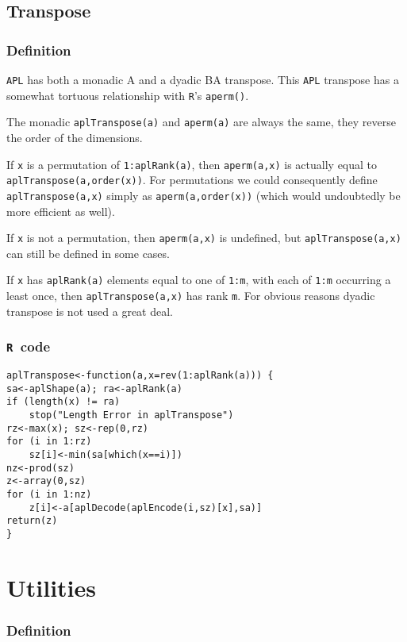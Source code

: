 \documentclass[11pt]{amsart}
\theoremstyle{plain}
\theoremstyle{definition}
\theoremstyle{remark}
\newcommand{\tR}{\texttt{R}}
\begin{document}
\subsection{Transpose}
\subsubsection{Definition}
\texttt{APL} has both a monadic {\apl\qtran A} and a dyadic {\apl B\qtran A} transpose. This \texttt{APL} transpose has a somewhat tortuous relationship
with \texttt{R}'s \texttt{aperm()}.

The monadic \texttt{aplTranspose(a)} and
\texttt{aperm(a)} are always the same, they reverse the order of the
dimensions.

If \lstinline{x} is a permutation
of \lstinline{1:aplRank(a)}, then \lstinline{aperm(a,x)} is
actually equal to \lstinline{aplTranspose(a,order(x))}.
For
permutations we could consequently define
\lstinline{aplTranspose(a,x)} simply as \lstinline{aperm(a,order(x))} (which would undoubtedly be more efficient as well).

If \lstinline{x} is not
a permutation, then \lstinline{aperm(a,x)} is undefined, but
\lstinline{aplTranspose(a,x)} can still be defined in some
cases.

If \lstinline{x} has \lstinline{aplRank(a)} elements equal to
one of \lstinline{1:m},  with each of \lstinline{1:m}
occurring a least once, then \lstinline{aplTranspose(a,x)}
has rank \lstinline{m}. For obvious reasons dyadic
transpose is not used a great deal.

\subsubsection{\tR\ code}\quad
\begin{lstlisting}
aplTranspose<-function(a,x=rev(1:aplRank(a))) {
sa<-aplShape(a); ra<-aplRank(a)
if (length(x) != ra)
    stop("Length Error in aplTranspose")
rz<-max(x); sz<-rep(0,rz)
for (i in 1:rz)
    sz[i]<-min(sa[which(x==i)])
nz<-prod(sz)
z<-array(0,sz)
for (i in 1:nz)
    z[i]<-a[aplDecode(aplEncode(i,sz)[x],sa)]
return(z)
}
\end{lstlisting}

\section{Utilities}\quad
\subsubsection{Definition}
\end{document}
